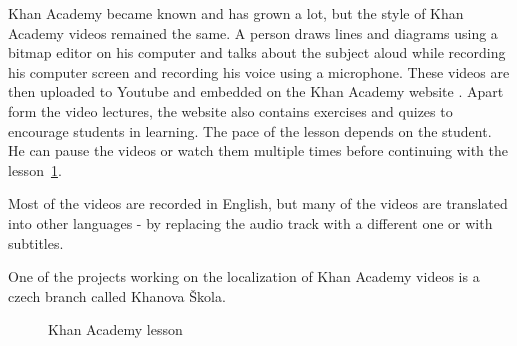Khan Academy became known and has grown a lot, but the style of Khan Academy videos remained the same. A person draws lines and diagrams using a bitmap editor on his computer and talks about the subject aloud while recording his computer screen and recording his voice using a microphone. These videos are then uploaded to Youtube and embedded on the Khan Academy website \cite{14}. Apart form the video lectures, the website also contains exercises and quizes to encourage students in learning. The pace of the lesson depends on the student. He can pause the videos or watch them multiple times before continuing with the lesson~\ref{fig:khan-screen}.

Most of the videos are recorded in English, but many of the videos are translated into other languages - by replacing the audio track with a different one or with subtitles.

One of the projects working on the localization of Khan Academy videos is a czech branch called Khanova Škola\cite{15}.

\begin{figure}
	\centering
	\caption{Khan Academy lesson}
	\label{fig:khan-screen}
\end{figure}